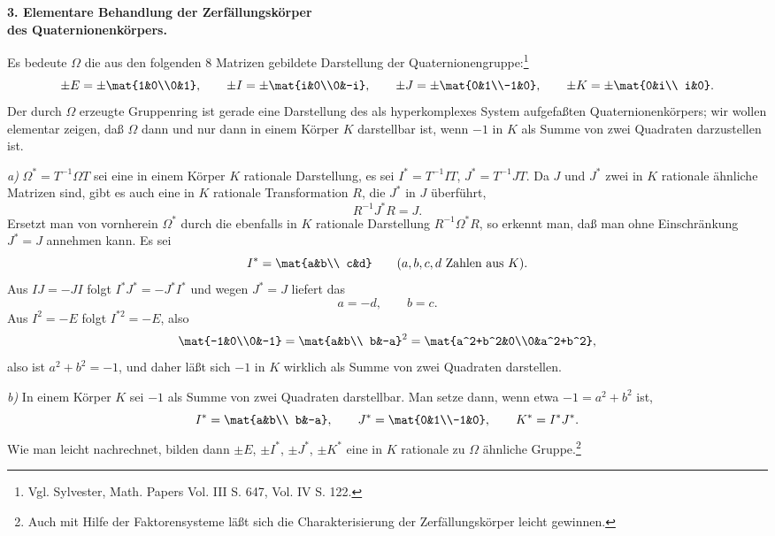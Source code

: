 
\begin{center}
\textbf{3. Elementare Behandlung der Zerfällungskörper\\
des Quaternionenkörpers.}
\end{center}

Es bedeute $\Omega$ die aus den folgenden 8 Matrizen gebildete Darstellung der Quaternionengruppe:\footnote{Vgl. Sylvester, Math. Papers Vol. III S. 647, Vol. IV S. 122.}
\[
\pm E=\pm\mat{1&0\\0&1},\qquad
\pm I=\pm\mat{i&0\\0&-i},\qquad
\pm J=\pm\mat{0&1\\-1&0},\qquad
\pm K=\pm\mat{0&i\\ i&0}.
\]
Der durch $\Omega$ erzeugte Gruppenring ist gerade eine Darstellung des als hyperkomplexes System aufgefaßten Quaternionenkörpers; wir wollen elementar zeigen, daß $\Omega$ dann und nur dann in einem Körper $K$ darstellbar ist, wenn $-1$ in $K$ als Summe von zwei Quadraten darzustellen ist.

\emph{a)} $\Omega^*=T^{-1}\Omega T$ sei eine in einem Körper $K$ rationale Darstellung, es sei $I^*=T^{-1}IT$, $J^*=T^{-1}JT$. Da $J$ und $J^*$ zwei in $K$ rationale ähnliche Matrizen sind, gibt es auch eine in $K$ rationale Transformation $R$, die $J^*$ in $J$ überführt,
\[
        R^{-1}J^*R=J.
\]
Ersetzt man von vornherein $\Omega^*$ durch die ebenfalls in $K$ rationale Darstellung $R^{-1}\Omega^*R$, so erkennt man, daß man ohne Einschränkung $J^*=J$ annehmen kann. Es sei
\[
        I^*=\mat{a&b\\ c&d}\qquad (a,b,c,d\text{ Zahlen aus }K).
\]
Aus $IJ=-JI$ folgt $I^*J^*=-J^*I^*$ und wegen $J^*=J$ liefert das
\[
        a=-d,
        \qquad b=c.
\]
Aus $I^2=-E$ folgt $I^{*2}=-E$, also
\[
        \mat{-1&0\\0&-1}=\mat{a&b\\ b&-a}^2
        =\mat{a^2+b^2&0\\0&a^2+b^2},
\]
also ist $a^2+b^2=-1$, und daher läßt sich $-1$ in $K$ wirklich als Summe von zwei Quadraten darstellen.

\emph{b)} In einem Körper $K$ sei $-1$ als Summe von zwei Quadraten darstellbar. Man setze dann, wenn etwa $-1=a^2+b^2$ ist,
\[
        I^*=\mat{a&b\\ b&-a},\qquad
        J^*=\mat{0&1\\-1&0},\qquad
        K^*=I^*J^*.
\]
Wie man leicht nachrechnet, bilden dann $\pm E$, $\pm I^*$, $\pm J^*$, $\pm K^*$ eine in $K$ rationale zu $\Omega$ ähnliche Gruppe.\footnote{Auch mit Hilfe der Faktorensysteme läßt sich die Charakterisierung der Zerfällungskörper leicht gewinnen.}

